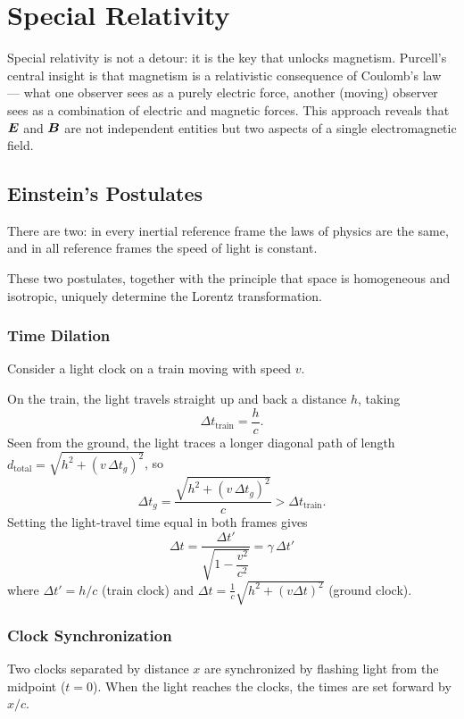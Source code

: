 \chapter{Special Relativity}

Special relativity is not a detour: it is the key that unlocks magnetism. Purcell's central insight is that magnetism is a relativistic consequence of Coulomb's law — what one observer sees as a purely electric force, another (moving) observer sees as a combination of electric and magnetic forces. This approach reveals that $\vect{E}$ and $\vect{B}$ are not independent entities but two aspects of a single electromagnetic field.

\section{Einstein's Postulates}

There are two: in every inertial reference frame the laws of physics are the same, and in all reference frames the speed of light is constant.

These two postulates, together with the principle that space is homogeneous and isotropic, uniquely determine the Lorentz transformation.

\subsection*{Time Dilation}

Consider a light clock on a train moving with speed $v$.

On the train, the light travels straight up and back a distance $h$, taking
\[
  \Delta t_{\text{train}} = \frac{h}{c}.
\]
Seen from the ground, the light traces a longer diagonal path of length $d_{\text{total}} = \sqrt{h^2 + (v\,\Delta t_g)^2}$, so
\[
  \Delta t_g = \frac{\sqrt{h^2 + (v\,\Delta t_g)^2}}{c} > \Delta t_{\text{train}}.
\]
Setting the light-travel time equal in both frames gives
\[
  \Delta t = \frac{\Delta t'}{\sqrt{1 - \dfrac{v^2}{c^2}}} = \gamma\,\Delta t'
\]
where $\Delta t' = h/c$ (train clock) and $\Delta t = \tfrac{1}{c}\sqrt{h^2+(v\Delta t)^2}$ (ground clock).

\subsection*{Clock Synchronization}

Two clocks separated by distance $x$ are synchronized by flashing light from the midpoint ($t=0$). When the light reaches the clocks, the times are set forward by $x/c$.

